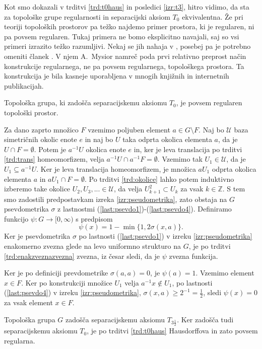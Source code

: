 \documentclass[mat1]{fmfdelo}
\newcommand{\Z}{\mathbb Z}
\newcommand{\Ucurl}{\mathcal{U}}
\begin{document}
Kot smo dokazali v trditvi \ref{trd:t0haus} in posledici \ref{izr:t3}, hitro vidimo, da sta za topološke grupe regularnosti in separacijski aksiom $T_0$ ekvivalentna. Že pri teoriji topoloških prostorov pa težko najdemo primer prostora, ki je regularen, ni pa povsem regularen. Tukaj primera ne bomo eksplicitno navajali, saj so vsi primeri izrazito težko razumljivi. Nekaj se jih nahaja v \cite{bib:counterexamples}, posebej pa je potrebno omeniti članek \cite{bib:clanekt3pol}. V njem A.~Mysior namreč poda prvi relativno preprost način konstrukcije regularnega, ne pa povsem regularnega, topološkega prostora. Ta konstrukcija je bila kasneje uporabljena v mnogih knjižnih in internetnih publikacijah.
\begin{izrek}\label{izr:t3pol}
	Topološka grupa, ki zadošča separacijskemu aksiomu $T_0$, je povsem regularen topološki prostor.
\end{izrek}

\begin{dokaz}
Za dano zaprto množico $F$ vzemimo poljuben element $a \in G\setminus F$.
Naj bo $\Ucurl$ baza simetričnih okolic enote $e$ in naj bo $U$ taka odprta okolica elementa $a$, da je $U \cap F = \emptyset$. Potem je $a^{-1}U$ okolica enote $e$ in, ker je leva translacija po trditvi \ref{trd:trans} homeomorfizem, velja $a^{-1}U \cap a^{-1}F = \emptyset$. Vzemimo tak $U_1 \in \Ucurl$, da je $U_1 \subseteq a^{-1}U$. Ker je leva translacija homeomorfizem, je množica $aU_1$ odprta okolica elementa $a$ in $aU_1 \cap F = \emptyset$. Po trditvi \ref{trd:okolice} lahko potem induktivno izberemo take okolice $U_2, U_3,... \in \Ucurl$, da velja $U_{k+1}^2 \subset U_k$ za vsak $k \in \Z$. S tem smo zadostili predpostavkam izreka \ref{izr:pseudometrika}, zato obstaja na $G$ psevdometrika $\sigma$ z lastnostmi (\ref{last:psevdo1})-(\ref{last:psevdo4}). Definiramo funkcijo $\psi\colon G \to [0, \infty)$ s predpisom
\[ \psi(x) = 1 - \min\lbrace 1, 2\sigma(x, a)\rbrace. \]
Ker je psevdometrika $\sigma$ po lastnosti (\ref{last:psevdo1}) v izreku \ref{izr:pseudometrika} enakomerno zvezna glede na levo uniformno strukturo na $G$, je po trditvi \ref{trd:enakzveznazvezna} zvezna, iz česar sledi, da je $\psi$ zvezna funkcija.

Ker je po definiciji prevdometrike $\sigma(a, a) = 0$, je $\psi(a) = 1$.
Vzemimo element $x \in F$. Ker po konstrukciji množice $U_1$ velja $a^{-1}x \notin U_1$, po lastnosti (\ref{last:psevdo4}) v izreku \ref{izr:pseudometrika}, $\sigma(x, a) \geq 2^{-1} = \frac{1}{2}$, sledi $\psi(x) = 0$ za vsak element $x \in F$.

Topološka grupa $G$ zadošča separacijskemu aksiomu $T_{3\frac{1}{2}}$. Ker zadošča tudi separacijskemu aksiomu $T_0$, je po trditvi \ref{trd:t0haus} Hausdorffova in zato povsem regularna.
\end{dokaz}
\end{document}
